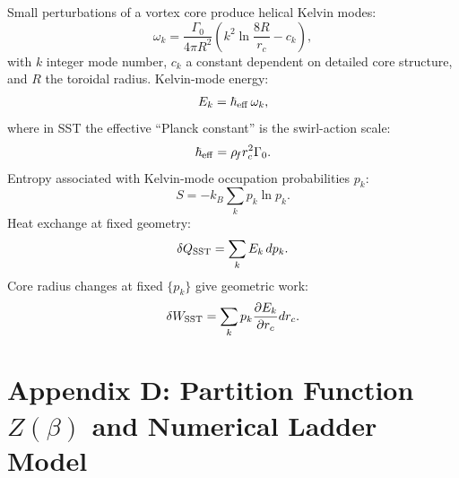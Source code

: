 \documentclass[11pt]{article}
\newcommand{\rhof}{\rho_{\!f}} \newcommand{\rhoF}{\rho_{\!f}}                             %
\newcommand{\rc}{r_c}                                    %
\begin{document}
        Small perturbations of a vortex core produce helical Kelvin modes:
        \begin{equation}
            \omega_k = \frac{\Gamma_0}{4\pi R^2}
            \left( k^2 \ln\!\frac{8R}{\rc} - c_k \right),
        \end{equation}
        with $k$ integer mode number, $c_k$ a constant dependent on detailed core
        structure, and $R$ the toroidal radius.
        Kelvin-mode energy:
        \begin{equation}
            E_k = \hbar_{\rm eff}\, \omega_k,
        \end{equation}
        where in SST the effective ``Planck constant'' is the swirl-action scale:
        \begin{equation}
            \hbar_{\rm eff} = \rhof \rc^2 \Gamma_0.
        \end{equation}
        Entropy associated with Kelvin-mode occupation probabilities $p_k$:
        \begin{equation}
            S = -k_B \sum_k p_k \ln p_k.
        \end{equation}
        Heat exchange at fixed geometry:
        \begin{equation}
            \delta Q_{\rm SST} = \sum_k E_k \, dp_k.
        \end{equation}
        Core radius changes at fixed $\{p_k\}$ give geometric work:
        \begin{equation}
            \delta W_{\rm SST} = \sum_k p_k \frac{\partial E_k}{\partial \rc} d\rc.
        \end{equation}

    \section*{Appendix D: Partition Function $Z(\beta)$ and Numerical Ladder Model}
\end{document}
